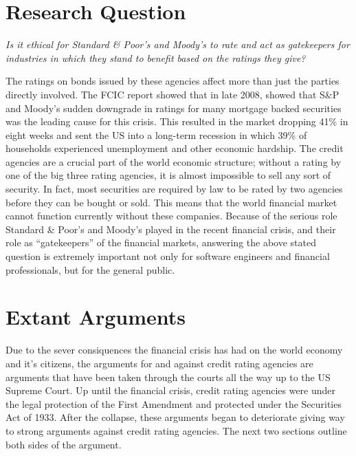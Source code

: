 \documentclass[11pt]{article}
\begin{document}
\begin{multicols}{2}

\section{Research Question}

\textit{Is it ethical for Standard \& Poor's and Moody's to rate and act as gatekeepers for industries in which they stand to benefit based on the ratings they give?}
\newline

The ratings on bonds issued by these agencies affect more than just the parties directly involved. The FCIC report showed that in late 2008, showed that S\&P and Moody's sudden downgrade in ratings for many mortgage backed securities was the leading cause for this crisis. \cite{huffCreditCause}  This resulted in the market dropping 41\% in eight weeks \cite{marketWatch} and sent the US into a long-term recession in which 39\% of households experienced unemployment and other economic hardship. \cite{collapseImpact}  The credit agencies are a crucial part of the world economic structure; without a rating by one of the big three rating agencies, it is almost impossible to sell any sort of security.  In fact, most securities are required by law to be rated by two agencies before they can be bought or sold. \cite{wpMoodies}  This means that the world financial market cannot function currently without these companies.  Because of the serious role Standard \& Poor's and Moody's played in the recent financial crisis, and their role as ``gatekeepers'' of the financial markets, answering the above stated question is extremely important not only for software engineers and financial professionals, but for the general public.    


\section{Extant Arguments}

Due to the sever consiquences the financial crisis has had on the world economy and it's citizens, the arguments for and against credit rating agencies are arguments that have been taken through the courts all the way up to the US Supreme Court.  Up until the financial crisis, credit rating agencies were under the legal protection of the First Amendment and protected under the Securities Act of 1933.  After the collapse, these arguments began to deteriorate giving way to strong arguments against credit rating agencies.  The next two sections outline both sides of the argument.


\end{multicols}
\end{document}
